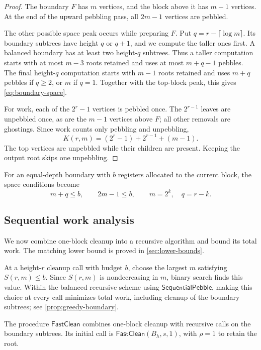 \documentclass[11pt]{article}
\theoremstyle{definition}
\theoremstyle{remark}
\newcommand{\Fast}{\mathsf{SequentialPebble}}
\newcommand{\Clean}{\mathsf{FastClean}}
\begin{document}
\begin{proof}
The boundary $F$ has $m$ vertices, and the block above it has $m-1$ vertices. At the end of the upward pebbling pass, all $2m-1$ vertices are pebbled.

The other possible space peak occurs while preparing $F$. Put $q=r-\lceil\log m\rceil$. Its boundary subtrees have height $q$ or $q+1$, and we compute the taller ones first. A balanced boundary has at least two height-$q$ subtrees. Thus a taller computation starts with at most $m-3$ roots retained and uses at most $m+q-1$ pebbles. The final height-$q$ computation starts with $m-1$ roots retained and uses $m+q$ pebbles if $q\ge2$, or $m$ if $q=1$. Together with the top-block peak, this gives \cref{eq:boundary-space}.

For work, each of the $2^r-1$ vertices is pebbled once. The $2^{r-1}$ leaves are unpebbled once, as are the $m-1$ vertices above $F$; all other removals are ghostings. Since work counts only pebbling and unpebbling,
\[
 K(r,m)=(2^r-1)+2^{r-1}+(m-1).
\]
The top vertices are unpebbled while their children are present. Keeping the output root skips one unpebbling.
\end{proof}

For an equal-depth boundary with $b$ registers allocated to the current block, the space conditions become
\begin{equation}
 m+q\le b,\qquad 2m-1\le b,\qquad m=2^k,\quad q=r-k.
 \label{eq:feasible-cut}
\end{equation}

\subsection{Sequential work analysis}
\label{sec:sequential}

We now combine one-block cleanup into a recursive algorithm and bound its total work. The matching lower bound is proved in \cref{sec:lower-bounds}.

At a height-$r$ cleanup call with budget $b$, choose the largest $m$ satisfying $S(r,m)\le b$. Since $S(r,m)$ is nondecreasing in $m$, binary search finds this value. Within the balanced recursive scheme using $\Fast$, making this choice at every call minimizes total work, including cleanup of the boundary subtrees; see \cref{prop:greedy-boundary}.

The procedure $\Clean$ combines one-block cleanup with recursive calls on the boundary subtrees. Its initial call is $\Clean(B_h,s,1)$, with $\rho=1$ to retain the root.
\end{document}
